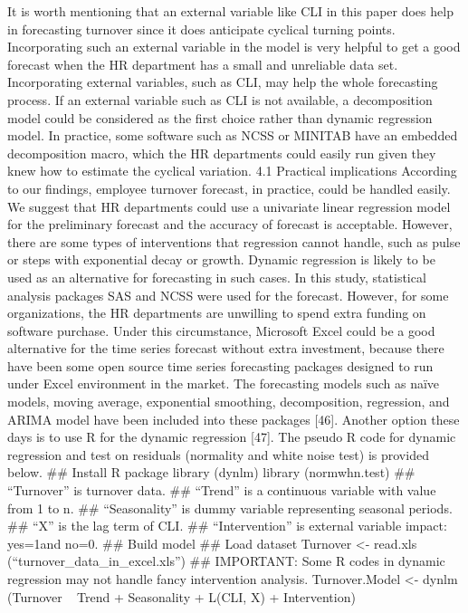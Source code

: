 It is worth mentioning that an external variable like CLI in this paper does help in forecasting turnover since it does anticipate cyclical turning points. Incorporating such an external variable in the model is very helpful to get a good forecast when the HR department has a small and unreliable data set. Incorporating external variables, such as CLI, may help the whole forecasting process. If an external variable such as CLI is not available, a decomposition model could be considered as the first choice rather than dynamic regression model. In practice, some software such as NCSS or MINITAB have an embedded decomposition macro, which the HR departments could easily run given they knew how to estimate the cyclical variation.
4.1    Practical implications
	According to our findings, employee turnover forecast, in practice, could be handled easily. We suggest that HR departments could use a univariate linear regression model for the preliminary forecast and the accuracy of forecast is acceptable. However, there are some types of interventions that regression cannot handle, such as pulse or steps with exponential decay or growth. Dynamic regression is likely to be used as an alternative for forecasting in such cases.
	In this study, statistical analysis packages SAS and NCSS were used for the forecast. However, for some organizations, the HR departments are unwilling to spend extra funding on software purchase. Under this circumstance, Microsoft Excel could be a good alternative for the time series forecast without extra investment, because there have been some open source time series forecasting packages designed to run under Excel environment in the market. The forecasting models such as naïve models, moving average, exponential smoothing, decomposition, regression, and ARIMA model have been included into these packages [46].
	Another option these days is to use R for the dynamic regression [47]. The pseudo R code for dynamic regression and test on residuals (normality and white noise test) is provided below. 
## Install R package
library (dynlm)
library (normwhn.test)
## “Turnover” is turnover data.  
## “Trend” is a continuous variable with value from 1 to n. 
## “Seasonality” is dummy variable representing seasonal periods. 
## “X” is the lag term of CLI.
## “Intervention” is external variable impact: yes=1and no=0.
## Build model ## Load dataset
Turnover <- read.xls (“turnover_data_in_excel.xls”)
## IMPORTANT: Some R codes in dynamic regression may not handle fancy intervention analysis.
Turnover.Model <- dynlm (Turnover ~ Trend + Seasonality + L(CLI, X) + Intervention) 
